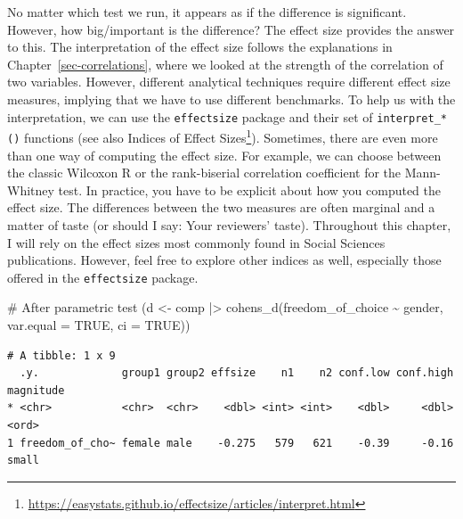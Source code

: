 \documentclass[
  letterpaper,
]{krantz}
\makeatletter
\newenvironment{Shaded}{\begin{snugshade}}{\end{snugshade}}
\newcommand{\AttributeTok}[1]{\textcolor[rgb]{0.40,0.45,0.13}{#1}}
\newcommand{\CommentTok}[1]{\textcolor[rgb]{0.37,0.37,0.37}{#1}}
\newcommand{\ConstantTok}[1]{\textcolor[rgb]{0.56,0.35,0.01}{#1}}
\newcommand{\FunctionTok}[1]{\textcolor[rgb]{0.28,0.35,0.67}{#1}}
\newcommand{\NormalTok}[1]{\textcolor[rgb]{0.00,0.23,0.31}{#1}}
\newcommand{\OtherTok}[1]{\textcolor[rgb]{0.00,0.23,0.31}{#1}}
\newcommand{\SpecialCharTok}[1]{\textcolor[rgb]{0.37,0.37,0.37}{#1}}
\renewcommand{\href}[2]{#2\footnote{\url{#1}}}
\newenvironment{kframe}{%
\medskip{}
\setlength{\fboxsep}{.8em}
 \def\at@end@of@kframe{}%
 \ifinner\ifhmode%
  \def\at@end@of@kframe{\end{minipage}}%
  \begin{minipage}{\columnwidth}%
 \fi\fi%
 \def\FrameCommand##1{\hskip\@totalleftmargin \hskip-\fboxsep
 \colorbox{shadecolor}{##1}\hskip-\fboxsep
     \hskip-\linewidth \hskip-\@totalleftmargin \hskip\columnwidth}%
 \MakeFramed {\advance\hsize-\width
   \@totalleftmargin\z@ \linewidth\hsize
   \@setminipage}}%
 {\par\unskip\endMakeFramed%
 \at@end@of@kframe}
\renewenvironment{Shaded}{\begin{kframe}}{\end{kframe}}
\makeatother
\begin{document}
No matter which test we run, it appears as if the difference is
significant. However, how big/important is the difference? The effect
size provides the answer to this. The interpretation of the effect size
follows the explanations in Chapter~\ref{sec-correlations}, where we
looked at the strength of the correlation of two variables. However,
different analytical techniques require different effect size measures,
implying that we have to use different benchmarks. To help us with the
interpretation, we can use the \texttt{effectsize} package and their set
of \texttt{interpret\_*()} functions (see also
\href{https://easystats.github.io/effectsize/articles/interpret.html}{Indices
of Effect Sizes}). Sometimes, there are even more than one way of
computing the effect size. For example, we can choose between the
classic Wilcoxon R or the rank-biserial correlation coefficient for the
Mann-Whitney test. In practice, you have to be explicit about how you
computed the effect size. The differences between the two measures are
often marginal and a matter of taste (or should I say: Your reviewers'
taste). Throughout this chapter, I will rely on the effect sizes most
commonly found in Social Sciences publications. However, feel free to
explore other indices as well, especially those offered in the
\texttt{effectsize} package.

\begin{Shaded}
\begin{Highlighting}[]
\CommentTok{\# After parametric test}
\NormalTok{(d }\OtherTok{\textless{}{-}}
\NormalTok{    comp }\SpecialCharTok{|\textgreater{}}
    \FunctionTok{cohens\_d}\NormalTok{(freedom\_of\_choice }\SpecialCharTok{\textasciitilde{}}\NormalTok{ gender,}
             \AttributeTok{var.equal =} \ConstantTok{TRUE}\NormalTok{,}
             \AttributeTok{ci =} \ConstantTok{TRUE}\NormalTok{))}
\end{Highlighting}
\end{Shaded}

\begin{verbatim}
# A tibble: 1 x 9
  .y.             group1 group2 effsize    n1    n2 conf.low conf.high magnitude
* <chr>           <chr>  <chr>    <dbl> <int> <int>    <dbl>     <dbl> <ord>    
1 freedom_of_cho~ female male    -0.275   579   621    -0.39     -0.16 small    
\end{verbatim}

\begin{Shaded}
\end{Shaded}
\end{document}
